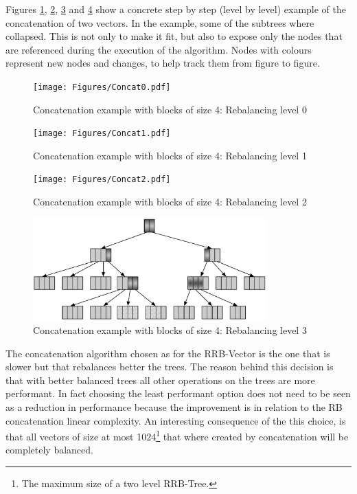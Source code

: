 Figures \ref{Concat0Benchmarks}, \ref{Concat1Benchmarks}, \ref{Concat2Benchmarks} and \ref{Concat3Benchmarks} show a concrete step by step (level by level) example of the concatenation of two vectors. In the example, some of the subtrees where collapsed. This is not only to make it fit, but also to expose only the nodes that are referenced during the execution of the algorithm. Nodes with colours represent new nodes and changes, to help track them from figure to figure.

\begin{figure}[h!]
  \centering
  \texttt{[image: Figures/Concat0.pdf]}
  \caption{Concatenation example with blocks of size 4: Rebalancing level 0}
  \label{Concat0Benchmarks}
\end{figure}

\begin{figure}[h!]
  \centering
  \texttt{[image: Figures/Concat1.pdf]}
  \caption{Concatenation example with blocks of size 4: Rebalancing level 1}
  \label{Concat1Benchmarks}
\end{figure}

\begin{figure}[h!]
  \centering
  \texttt{[image: Figures/Concat2.pdf]}
  \caption{Concatenation example with blocks of size 4: Rebalancing level 2}
  \label{Concat2Benchmarks}
\end{figure}

\begin{figure}[h!]
  \centering
  \includegraphics[width=0.8\textwidth]{Figures/Concat3.pdf}
  \caption{Concatenation example with blocks of size 4: Rebalancing level 3}
  \label{Concat3Benchmarks}
\end{figure}

The concatenation algorithm chosen as for the RRB-Vector is the one that is slower but that rebalances better the trees. The reason behind this decision is that with better balanced trees all other operations on the trees are more performant. In fact choosing the least performant option does not need to be seen as a reduction in performance because the improvement is in relation to the RB concatenation linear complexity. An interesting consequence of the this choice, is that all vectors of size at most 1024\footnote{The maximum size of a two level RRB-Tree.} that where created by concatenation will be completely balanced.

